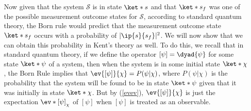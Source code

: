 \documentclass[12pt]{report}
\begin{document}

Now given that the system $\mathcal{S}$ is in state $\ket*{s}$ and that $\ket*{s_f}$ was one of the possible measurement outcome states for $\mathcal{S}$, according to standard quantum theory, the Born rule would predict that the measurement outcome state $\ket*{s_f}$ occurs with a probability of $|\ip{s}{s_f}|^2$. We will now show that we can obtain this probability in Kent's theory as well. To do this, we recall that in standard quantum theory, if  we define the operator $[\psi]=\dyad{\psi}$ %
%
for some state $\ket*{\psi}$ of a system, then when the system is in some initial state $\ket*{\chi}$, the Born Rule implies that $\ev{[\psi]}{\chi}=P(\psi|\chi)$, where $P(\psi|\chi)$ is the probability that the system will be found to be in state $\ket*{\psi}$ given that it was initially in state $\ket*{\chi}$. But by (\ref{evev}),  $\ev{[\psi]}{\chi}$ is just the expectation $\ev*{[\psi]}_\chi$ of $[\psi]$ when $[\psi]$ is treated as an observable. 
\end{document}
